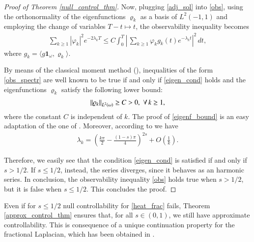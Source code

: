 \begin{proof}[Proof of Theorem \ref{null_control_thm}]
Now, plugging \eqref{adj_sol} into \eqref{obs}, using the orthonormality of the eigenfunctions $\varrho_k$ as a basis of $L^2(-1,1)$ and employing the change of variables $T-t\mapsto t$, the observability inequality becomes 
\begin{align}\label{obs_spectr}
	\sum_{k\geq 1} |\varphi_k|^2e^{-2\lambda_k T} \leq C\int_0^T\left|\,\sum_{k\geq 1} \varphi_kg_k(t)e^{-\lambda_k t}\right|^2\,dt, 
\end{align}
where $g_k = \langle g\mathbf{1}_{\omega},\varrho_k\rangle$. 
	
By means of the classical moment method (\cite{fattorini1971exact}), inequalities of the form \eqref{obs_spectr} are well known to be true if and only if \eqref{eigen_cond} holds and the eigenfunctions $\varrho_k$ satisfy the following lower bound:
\begin{align}\label{eigenf_bound}
	{\left\|\varrho_k\right\|}_{L^2(\omega)}\geq C>0, \,\,\forall \, k\geq 1,
\end{align}
where the constant $C$ is independent of $k$. The proof of \eqref{eigenf_bound} is an easy adaptation of the one of \cite[Lemma 2]{kwasnicki2012eigenvalues}. Moreover, according to \cite{kulczycki2010spectral,kwasnicki2012eigenvalues} we have 
\begin{align*}
	\lambda_k = \left(\frac{k\pi}{2}-\frac{(1-s)\pi}{4}\right)^{2s}+O\left(\frac{1}{k}\right).
\end{align*}
	
Therefore, we easily see that the condition \eqref{eigen_cond} is satisfied if and only if $s>1/2$. If $s\leq 1/2$, instead, the series diverges, since it behaves as an harmonic series. In conclusion, the observability inequality \eqref{obs} holds true when $s>1/2$, but it is false when $s\leq 1/2$. This concludes the proof. 
\end{proof}

Even if for $s\leq 1/2$ null controllability for \eqref{heat_frac} fails, Theorem \ref{approx_control_thm} ensures that, for all $s\in(0,1)$, we still have approximate controllability. This is consequence of a unique continuation property for the fractional Laplacian, which has been obtained in \cite{fall2014unique}.

